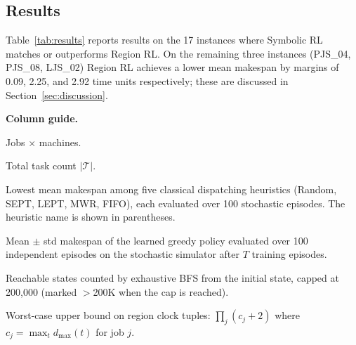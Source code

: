 
\subsection{Results}
\label{sec:results}

Table~\ref{tab:results} reports results on the 17 instances where Symbolic RL
matches or outperforms Region RL.  On the remaining three instances (PJS\_04,
PJS\_08, LJS\_02) Region RL achieves a lower mean makespan by margins of
0.09, 2.25, and 2.92 time units respectively; these are discussed in
Section~\ref{sec:discussion}.

\medskip
\noindent\textbf{Column guide.}
\begin{description}[leftmargin=2em, itemsep=2pt]
  \item[\textbf{Size ($J{\times}M$).}] Jobs $\times$ machines.

  \item[\textbf{Tasks.}] Total task count $|\mathcal{T}|$.

  \item[\textbf{Best Baseline.}] Lowest mean makespan among five classical
    dispatching heuristics (Random, SEPT, LEPT, MWR, FIFO), each evaluated
    over 100 stochastic episodes.  The heuristic name is shown in
    parentheses.

  \item[\textbf{Symbolic RL / Region RL.}] Mean $\pm$ std makespan of the
    learned greedy policy evaluated over 100 independent episodes on the
    stochastic simulator after $T$ training episodes.

  \item[\textbf{Zone / Region States (BFS).}] Reachable states counted by
    exhaustive BFS from the initial state, capped at 200{,}000 (marked
    $>$200K when the cap is reached).

  \item[\textbf{Theory Bound.}] Worst-case upper bound on region clock tuples:
    $\prod_j (c_j + 2)$ where $c_j = \max_t d_{\max}(t)$ for job $j$.
\end{description}

